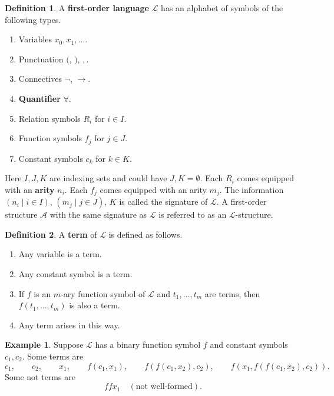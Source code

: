 \documentclass{article}
\newcommand{\rb}[1]{\left( #1 \right)}
\theoremstyle{definition}\newtheorem{definition}{Definition}[subsection]
\theoremstyle{definition}\newtheorem{remark}[definition]{Remark}
\theoremstyle{definition}\newtheorem*{example}{Example}
\theoremstyle{definition}\newtheorem*{note}{Note}
\begin{document}
\begin{definition}
A \textbf{first-order language} $ \mathcal{L} $ has an alphabet of symbols of the following types.
\begin{enumerate}
\item Variables $ x_0, x_1, \dots $.
\item Punctuation $ ( $, $ ) $, $ , $.
\item Connectives $ \neg $, $ \rightarrow $.
\item \textbf{Quantifier} $ \forall $.
\item Relation symbols $ R_i $ for $ i \in I $.
\item Function symbols $ f_j $ for $ j \in J $.
\item Constant symbols $ c_k $ for $ k \in K $.
\end{enumerate}
Here $ I, J, K $ are indexing sets and could have $ J, K = \emptyset $. Each $ R_i $ comes equipped with an \textbf{arity} $ n_i $. Each $ f_j $ comes equipped with an arity $ m_j $. The information $ \rb{n_i \mid i \in I} $, $ \rb{m_j \mid j \in J} $, $ K $ is called the signature of $ \mathcal{L} $. A first-order structure $ \mathcal{A} $ with the same signature as $ \mathcal{L} $ is referred to as an $ \mathcal{L} $-structure.
\end{definition}

\begin{definition}
A \textbf{term} of $ \mathcal{L} $ is defined as follows.
\begin{enumerate}
\item Any variable is a term.
\item Any constant symbol is a term.
\item If $ f $ is an $ m $-ary function symbol of $ \mathcal{L} $ and $ t_1, \dots, t_m $ are terms, then $ f\rb{t_1, \dots, t_m} $ is also a term.
\item Any term arises in this way.
\end{enumerate}
\end{definition}

\begin{example}
Suppose $ \mathcal{L} $ has a binary function symbol $ f $ and constant symbols $ c_1, c_2 $. Some terms are
$$ c_1, \qquad c_2, \qquad x_1, \qquad f\rb{c_1, x_1}, \qquad f\rb{f\rb{c_1, x_2}, c_2}, \qquad f\rb{x_1, f\rb{f\rb{c_1, x_2}, c_2}}. $$
Some not terms are
$$ ffx_1 \quad \rb{\text{not well-formed}}. $$
\end{example}

\end{document}
